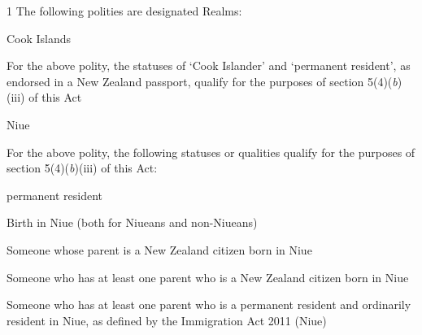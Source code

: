 \documentclass{ukbill}
\begin{document}
\begin{nostat}
\item[1]   The following polities are designated Realms:
\begin{numstat}
\item Cook Islands
\begin{alphstat}
	\item For the above polity, the statuses  of `Cook Islander' and `permanent resident', as endorsed in a New Zealand passport,  qualify for the purposes of section 5(4)(\textit{b})(iii) of this Act
\end{alphstat}
\item Niue
\begin{alphstat}
	\item For the above polity, the following statuses or qualities qualify for the purposes of section 5(4)(\textit{b})(iii) of this Act:
	\begin{romstat}
		\item permanent resident 
		\item Birth in Niue (both for Niueans and non-Niueans)
		\item Someone whose parent is a New Zealand citizen born in Niue
		\item Someone who has at least one parent who is a New Zealand citizen born in Niue
		\item Someone who has at least one parent who is a permanent resident and ordinarily resident in Niue, as defined by the Immigration Act 2011 (Niue)
	\end{romstat}
\end{alphstat} 
\end{numstat}
\end{nostat}
\end{document}
